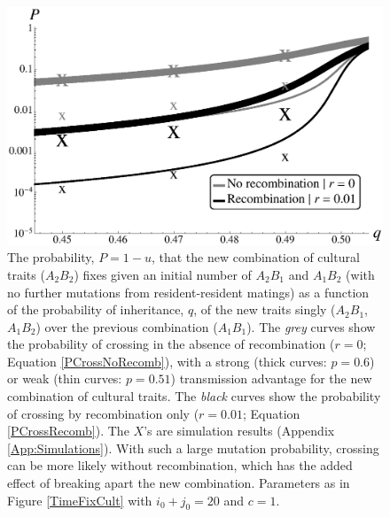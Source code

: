 \documentclass[review,3p,authoryear]{elsarticle}
\begin{document}
\begin{figure}[t]
\centering
\includegraphics[width=\linewidth]{IMAGES/ProbFixCultPSims.eps}
\caption{
The probability, $P=1-u$, that the new combination of cultural traits ($A_2B_2$) fixes given an initial number of $A_2B_1$ and $A_1B_2$ (with no further mutations from resident-resident matings) as a function of the probability of inheritance, $q$, of the new traits singly ($A_2B_1$, $A_1B_2$) over the previous combination ($A_1B_1$).
The \textit{grey} curves show the probability of crossing in the absence of recombination ($r=0$; Equation \ref{PCrossNoRecomb}), with a strong (thick curves: $p=0.6$) or weak (thin curves: $p=0.51$) transmission advantage for the new combination of cultural traits.  
The \textit{black} curves show the probability of crossing by recombination only ($r = 0.01$; Equation \ref{PCrossRecomb}).
The $X$'s are simulation results (Appendix \ref{App:Simulations}).
With such a large mutation probability, crossing can be more likely without recombination, which has the added effect of breaking apart the new combination.
Parameters as in Figure \ref{TimeFixCult} with $i_0+j_0=20$ and $c=1$.
}
\label{ProbFixCult}
\end{figure}
\end{document}
